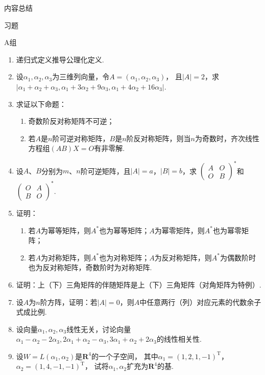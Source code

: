 \vspace{2ex}
\centerline{\heiti \Large 内容总结}

\vspace{2ex}

\centerline{\heiti \Large 习题}
\vspace{2ex}
{\kaishu }
\begin{flushright}
    \kaishu

\end{flushright}
\centerline{\heiti A组}
\begin{enumerate}
    \item 递归式定义推导公理化定义.
    \item 设$\alpha_1,\alpha_2,\alpha_3$为三维列向量，令$A=(\alpha_1,\alpha_2,\alpha_3)$，
	且$|A|=2$，求$|\alpha_1+\alpha_2+\alpha_3,\alpha_1+3\alpha_2+9\alpha_3,\alpha_1+4\alpha_2+16\alpha_3|$.
	\item 求证以下命题：
	\begin{enumerate}[label=(\arabic*)]
        \item 奇数阶反对称矩阵不可逆；
        \item 若$A$是$n$阶可逆对称矩阵，$B$是$n$阶反对称矩阵，则当$n$为奇数时，齐次线性方程组$(AB)X=O$有非零解.
    \end{enumerate}
    \item 设$A$、$B$分别为$m$、$n$阶可逆矩阵，且$|A|=a$，$|B|=b$，求
	$\begin{pmatrix}
		A & O \\ O & B
	\end{pmatrix}^*$和$\begin{pmatrix}
		O & A \\ B & O
	\end{pmatrix}^*$.
	\item 证明：
	\begin{enumerate}[label=(\arabic*)]
        \item 若$A$为幂等矩阵，则$A^*$也为幂等矩阵；$A$为幂零矩阵，则$A^*$也为幂零矩阵；
        \item 若$A$为对称矩阵，则$A^*$也为对称矩阵；$A$为反对称矩阵，则$A^*$为偶数阶时也为反对称矩阵，奇数阶时为对称矩阵.
    \end{enumerate}
	\item 证明：上（下）三角矩阵的伴随矩阵是上（下）三角矩阵（对角矩阵为特例）.
	\item 设$A$为$n$阶方阵，证明：若$|A|=0$，则$A$中任意两行（列）对应元素的代数余子式成比例.
	\item 设向量$\alpha_1,\alpha_2,\alpha_3$线性无关，讨论向量$\alpha_1-\alpha_2-2\alpha_3,
	2\alpha_1+\alpha_2-\alpha_3,3\alpha_1+\alpha_2+2\alpha_3$的线性相关性.
	\item 设$W=L(\alpha_1,\alpha_2)$是$\mathbf{R}^4$的一个子空间，
	其中$\alpha_1=(1,2,1,-1)^\mathrm{T}$，$\alpha_2=(1,4,-1,-1)^\mathrm{T}$，
	试将$\alpha_1,\alpha_2$扩充为$\mathbf{R}^4$的基.
\end{enumerate}
